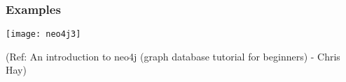 \begin{frame}[fragile]\frametitle{Examples}


\begin{center}
\texttt{[image: neo4j3]}
\end{center}	

{\tiny (Ref: An introduction to neo4j (graph database tutorial for beginners) - Chris Hay)}

\end{frame}


